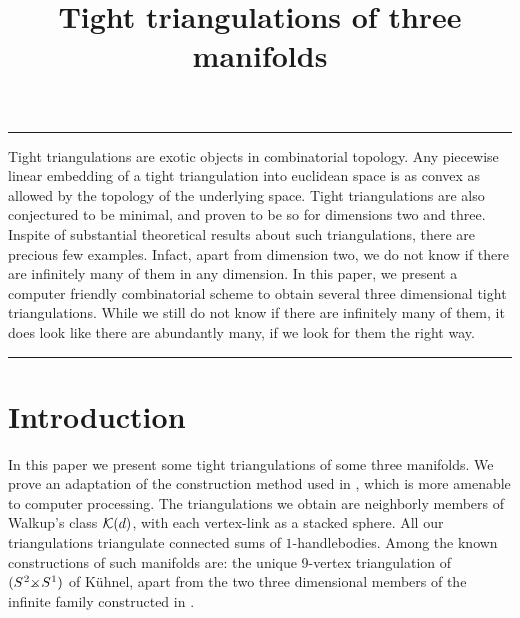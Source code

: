 \documentclass[11pt]{article}
\newcommand{\TPSST}{S^{\hspace{.2mm}2} \mbox{$\times
\hspace{-2.8mm}_{-}$} \, S^{\hspace{.1mm}1}}
\begin{document}

\title{\bf Tight triangulations of three manifolds}


\maketitle

\vspace{-5mm}





\begin{center}
\date{}
\end{center}





\hrule

\bigskip


\smallskip
{\small Tight triangulations are exotic objects in combinatorial topology.
Any piecewise linear embedding of a tight triangulation into euclidean
space is as convex as allowed by the topology of the underlying space.
Tight triangulations are also conjectured to be minimal, and proven to be
so for dimensions two and three. Inspite of substantial theoretical results
about such triangulations, there are precious few examples. Infact, apart
from dimension two, we do not know if there are infinitely many of them in
any dimension. In this paper, we present a computer friendly combinatorial
scheme to obtain several three dimensional tight triangulations. While we
still do not know if there are infinitely many of them, it does look like
there are abundantly many, if we look for them the right way.}

\bigskip


\bigskip

\hrule

\section{Introduction}
In this paper we present some tight triangulations of some three manifolds.
We prove an adaptation of the construction method used in \cite{bdns},
which is more amenable to computer processing. The triangulations we obtain
are 
neighborly members of Walkup's class ${\cal K}(d)$, with each vertex-link as a
stacked sphere. All our triangulations triangulate connected sums of
$1$-handlebodies. Among the known constructions of such manifolds are:
the unique 9-vertex triangulation of $(\TPSST)$ of K\"uhnel, apart from the
two three dimensional members
of the infinite family constructed in \cite{bdns}.
\end{document}
